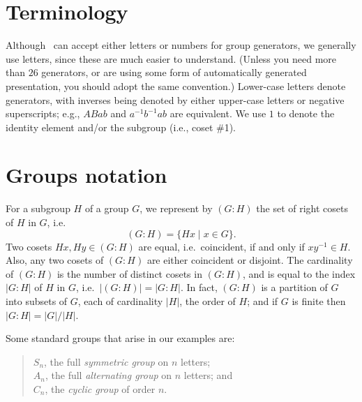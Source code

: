 


\section{Terminology}

Although \ace\ can accept either letters or numbers for group generators,
  we generally use letters, since these are much easier to understand.
(Unless you need more than $26$ generators, or are using some form of 
  automatically generated presentation, you should adopt the same
  convention.)
Lower-case letters denote generators, with inverses being denoted by either
  upper-case letters or negative superscripts; e.g., $ABab$ and
  $a^{-1}b^{-1}ab$ are equivalent.
We use $1$ to denote the identity element and/or the subgroup (i.e.,
  coset \#1).


\section{Groups notation}
For a subgroup $H$ of a group $G$, we represent by $(G:H)$ the set of right
  cosets of $H$ in $G$, i.e.
  $$ (G:H) = \{ Hx \mid x \in G \}. $$
Two cosets $Hx, Hy \in (G:H)$ are equal, i.e.~coincident, if and only if
  $xy^{-1} \in H$.
Also, any two cosets of $(G:H)$ are either coincident or disjoint.
The cardinality of $(G:H)$ is the number of distinct cosets in $(G:H)$,
  and is equal to the index $|G:H|$ of $H$ in $G$, 
  i.e.~$\bigl|(G:H)\bigr| = |G:H|$.
In fact, $(G:H)$ is a partition of $G$ into subsets of $G$, each of
  cardinality $|H|$, the order of $H$; and if $G$ is finite then
  $|G:H| = |G|/|H|$.

Some standard groups that arise in our examples are:
  \begin{quote}
    $S_n$, the full \emph{symmetric group} on $n$ letters;\\
    $A_n$, the full \emph{alternating group} on $n$ letters; and\\
    $C_n$, the \emph{cyclic group} of order $n$.
  \end{quote}

